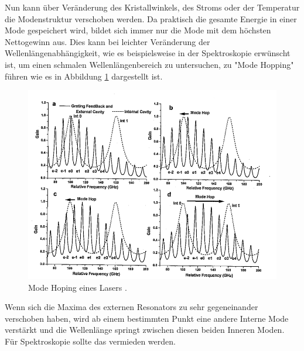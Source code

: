 \noindent Nun kann über Veränderung des Kristallwinkels, des Stroms oder der Temperatur die Modenstruktur verschoben werden.
Da praktisch die gesamte Energie in einer Mode gespeichert wird, bildet sich immer nur die Mode mit dem höchsten Nettogewinn aus. 
Dies kann bei leichter Veränderung der Wellenlängenabhängigkeit, wie es beispielsweise in der Spektroskopie erwünscht ist, um einen schmalen 
Wellenlängenbereich zu untersuchen, zu "Mode Hopping"  führen wie es in Abbildung \ref{fig:Moden2} dargestellt ist.
\begin{figure}[H]
    \centering
    \includegraphics[scale=0.8]{pictures/Moden2.png}
    \caption{Mode Hoping eines Lasers \cite{teachspin}.}
    \label{fig:Moden2}
\end{figure}
\noindent Wenn sich die Maxima des externen Resonators zu sehr gegeneinander verschoben haben, wird ab einem bestimmten Punkt eine andere Interne Mode verstärkt und 
die Wellenlänge springt zwischen diesen beiden Inneren Moden. Für Spektroskopie sollte das vermieden werden.
